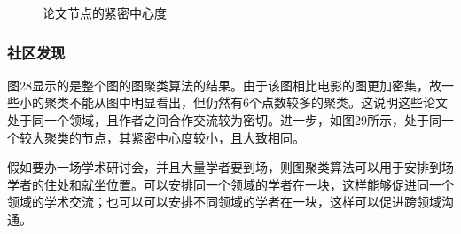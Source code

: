 \documentclass[UTF8, onecolumn, a4paper]{article}
\begin{document}
\begin{center}
\begin{figure}[ht]
\begin{minipage}[b]{0.95\linewidth}
\begin{minipage}[b]{0.46\linewidth}
				\caption{论文节点的紧密中心度}
			\end{minipage}
		\end{minipage}
	\end{figure}
\end{center}
\subsubsection{社区发现}
    图28显示的是整个图的图聚类算法的结果。由于该图相比电影的图更加密集，故一些小的聚类不能从图中明显看出，但仍然有6个点数较多的聚类。这说明这些论文处于同一个领域，且作者之间合作交流较为密切。进一步，如图29所示，处于同一个较大聚类的节点，其紧密中心度较小，且大致相同。
    
    假如要办一场学术研讨会，并且大量学者要到场，则图聚类算法可以用于安排到场学者的住处和就坐位置。可以安排同一个领域的学者在一块，这样能够促进同一个领域的学术交流；也可以可以安排不同领域的学者在一块，这样可以促进跨领域沟通。
\end{document}
